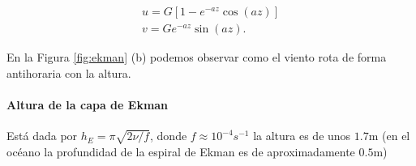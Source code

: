 \documentclass[openany]{book}
\begin{document}
\begin{gather}
    u=G[1-e^{-az}\cos{(az)}]\\
    v=Ge^{-az}\sin{(az)}.
\end{gather}

\par En la Figura \ref{fig:ekman} (b) podemos observar como el viento
rota de forma antihoraria con la altura.

\paragraph{Altura de la capa de Ekman} 
\par Está dada por $h_{E}=\pi\sqrt{2\nu/f}$, 
donde $f\approx 10^{-4}s^{-1}$ la altura es de unos $1.7\mathrm{m}$
(en el océano la profundidad de la espiral de Ekman es de 
aproximadamente $0.5\mathrm{m}$)
\end{document}
